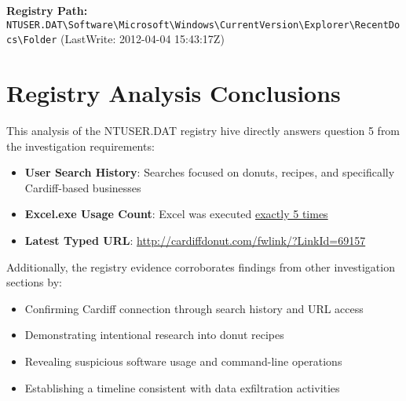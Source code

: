 \textbf{Registry Path:} \texttt{NTUSER.DAT\textbackslash Software\textbackslash Microsoft\textbackslash Windows\textbackslash CurrentVersion\textbackslash Explorer\textbackslash RecentDocs\textbackslash Folder} (LastWrite: 2012-04-04 15:43:17Z)

\section{Registry Analysis Conclusions}
This analysis of the NTUSER.DAT registry hive directly answers question 5 from the investigation requirements:

\begin{itemize}
    \item \textbf{User Search History}: Searches focused on donuts, recipes, and specifically Cardiff-based businesses
    \item \textbf{Excel.exe Usage Count}: Excel was executed \underline{exactly 5 times}
    \item \textbf{Latest Typed URL}: \url{http://cardiffdonut.com/fwlink/?LinkId=69157}
\end{itemize}

Additionally, the registry evidence corroborates findings from other investigation sections by:

\begin{itemize}
    \item Confirming Cardiff connection through search history and URL access
    \item Demonstrating intentional research into donut recipes
    \item Revealing suspicious software usage and command-line operations
    \item Establishing a timeline consistent with data exfiltration activities
\end{itemize}